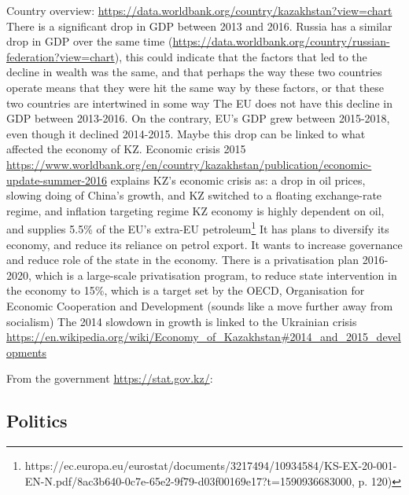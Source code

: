 \documentclass{article}
\begin{document}
\begin{outline}
	\1 Country overview: \url{https://data.worldbank.org/country/kazakhstan?view=chart}
		\2 There is a significant drop in GDP between 2013 and 2016. Russia has a similar drop in GDP over the same time (\url{https://data.worldbank.org/country/russian-federation?view=chart}), this could indicate that the factors that led to the decline in wealth was the same, and that perhaps the way these two countries operate means that they were hit the same way by these factors, or that these two countries are intertwined in some way
		\2 The EU does not have this decline in GDP between 2013-2016. On the contrary, EU's GDP grew between 2015-2018, even though it declined 2014-2015. Maybe this drop can be linked to what affected the economy of KZ.
	\1 Economic crisis 2015
		\2 \url{https://www.worldbank.org/en/country/kazakhstan/publication/economic-update-summer-2016} explains KZ's economic crisis as: a drop in oil prices, slowing doing of China's growth, and 
		\2 KZ switched to a floating exchange-rate regime, and inflation targeting regime 
		\2 KZ economy is highly dependent on oil, and supplies 5.5\% of the EU's extra-EU petroleum\footnote{https://ec.europa.eu/eurostat/documents/3217494/10934584/KS-EX-20-001-EN-N.pdf/8ac3b640-0c7e-65e2-9f79-d03f00169e17?t=1590936683000, p. 120)}
		\2 It has plans to diversify its economy, and reduce its reliance on petrol export. It wants to increase governance and reduce role of the state in the economy. There is a privatisation plan 2016-2020, which is a large-scale privatisation program, to reduce state intervention in the economy to 15\%, which is a target set by the OECD, Organisation for Economic Cooperation and Development (sounds like a move further away from socialism)
		\2 The 2014 slowdown in growth is linked to the Ukrainian crisis \url{https://en.wikipedia.org/wiki/Economy_of_Kazakhstan#2014_and_2015_developments}
\end{outline}

From the government \url{https://stat.gov.kz/}: 

\begin{outline}

\end{outline}

\subsection{Politics}
\end{document}
